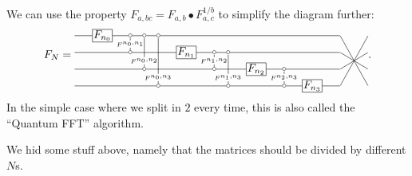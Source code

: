 We can use the property $F_{a,bc} = F_{a,b} \bullet F_{a,c}^{1/b}$ to simplify the diagram further:
\[
   F_N =
\begin{tikzpicture}[baseline=-2em, x=2.5em, y=1.5em, inner sep=1pt]
    \foreach \i in {0,...,3} {
        \node[rectangle,draw] (H\i) at (3.25*\i-\i*\i/4,-\i) {$F_{n_\i}$};
        \node[inner sep=0pt, minimum size=0pt] (L\i) at (-1,-\i) {};
        \node[inner sep=0pt, minimum size=0pt] (s\i) at (8.5,-\i) {};
        \node[inner sep=0pt, minimum size=0pt] (r\i) at (9.5,-\i) {};
    }
    \foreach \i in {0, 1, 2} {
        \pgfmathtruncatemacro{\j}{\i+1}
        \foreach \k in {\j,...,3} {
            \node[inner sep=0pt, minimum size=0pt] (b\i\k) at (1/2+2.75*\i-\i*\i/4+\k/2,-\i) {$\sbullet$};
            \node[inner sep=0pt, minimum size=0pt] (c\i\k) at (1/2+2.75*\i-\i*\i/4+\k/2,-\k) {$\sbullet$};
        }
    }
    \node (D00) at (1,-.5) {$\scriptscriptstyle F^{n_0, n_1}$};
    \node (D01) at (1.5,-1.5) {$\scriptscriptstyle F^{n_0, n_2}$};
    \node (D02) at (2,-2.5) {$\scriptscriptstyle F^{n_0, n_3}$};
    \draw (b01) -- (D00) -- (c01);
    \draw (b02) -- (D01) -- (c02);
    \draw (b03) -- (D02) -- (c03);
    \node (D10) at (4,-1.5) {$\scriptscriptstyle F^{n_1, n_2}$};
    \node (D11) at (4.5,-2.5) {$\scriptscriptstyle F^{n_1, n_3}$};
    \draw (b12) -- (D10) -- (c12);
    \draw (b13) -- (D11) -- (c13);
    \node (D20) at (6.5,-2.5) {$\scriptscriptstyle F^{n_2, n_3}$};
    \draw (b23) -- (D20) -- (c23);
    \draw (L0) -- (H0) -- (b01) -- (b02) -- (b03) -- (s0) -- (r3);
    \draw (L1) -- (c01) -- (H1) -- (b12) -- (b13) -- (s1) -- (r2);
    \draw (L2) -- (c02) -- (c12) -- (H2) -- (b23) -- (s2) -- (r1);
    \draw (L3) -- (c03) -- (c13) -- (c23) -- (H3) -- (s3) -- (r0);
\end{tikzpicture}
.
\]
In the simple case where we split in $2$ every time, this is also called the ``Quantum FFT'' algorithm.

We hid some stuff above, namely that the matrices should be divided by different $N$s.


